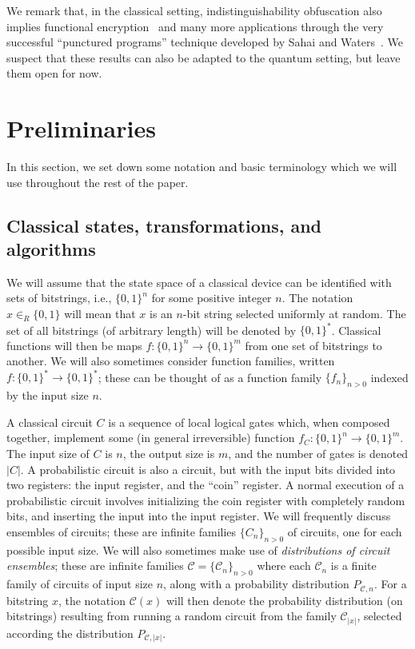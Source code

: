 \documentclass[11pt]{article}
\numberwithin{equation}{section}
\newcommand{\inrand}{\in_R}
\begin{document}
{We remark that, in the classical setting, indistinguishability obfuscation also implies functional encryption~\cite{GGHRSW13} and many more applications through the very successful ``punctured programs'' technique developed by Sahai and Waters~\cite{SW14}. We suspect that these results can also be adapted to the quantum setting, but leave them open for now.

\section{Preliminaries}

In this section, we set down some notation and basic terminology which we will use throughout the rest of the paper.

\subsection{Classical states, transformations, and algorithms}

We will assume that the state space of a classical device can be identified with sets of bitstrings, i.e., $\{0, 1\}^n$ for some positive integer $n$. The notation $x \inrand \{0, 1\}$ will mean that $x$ is an $n$-bit string selected uniformly at random. The set of all bitstrings (of arbitrary length) will be denoted by $\{0, 1\}^*$. Classical functions will then be maps $f : \{0, 1\}^n \rightarrow \{0, 1\}^m$ from one set of bitstrings to another. We will also sometimes consider function families, written $f : \{0, 1\}^* \rightarrow \{0, 1\}^*$; these can be thought of as a function family $\{f_n\}_{n>0}$ indexed by the input size $n$. 

A classical circuit $C$ is a sequence of local logical gates which, when composed together, implement some (in general irreversible) function $f_C: \{0, 1\}^n \rightarrow \{0, 1\}^m$. The input size of $C$ is $n$, the output size is $m$, and the number of gates is denoted $|C|$. A probabilistic circuit is also a circuit, but with the input bits divided into two registers: the input register, and the ``coin'' register. A normal execution of a probabilistic circuit involves initializing the coin register with completely random bits, and inserting the input into the input register. We will frequently discuss ensembles of circuits; these are infinite families $\{C_n\}_{n > 0}$ of circuits, one for each possible input size. We will also sometimes make use of \emph{distributions of circuit ensembles}; these are infinite families $\mathcal C = \{\mathcal C_n\}_{n > 0}$ where each $\mathcal C_n$ is a finite family of circuits of input size $n$, along with a probability distribution $P_{\mathcal C, n}$. For a bitstring $x$, the notation $\mathcal C(x)$ will then denote the probability distribution (on bitstrings) resulting from running a random circuit from the family $\mathcal C_{|x|}$, selected according the distribution $P_{\mathcal C, |x|}$.

}
\end{document}
